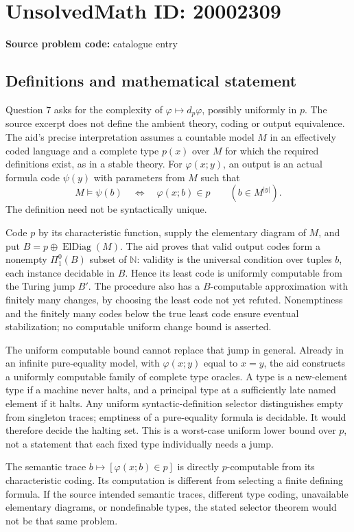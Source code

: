 \documentclass[11pt]{article}
\newcommand{\N}{\mathbb{N}}
\begin{document}
\section*{UnsolvedMath ID: 20002309}
\textbf{Source problem code:} catalogue entry
\subsection{Definitions and mathematical statement}
Question \(7\) asks for the complexity of \(\varphi\mapsto d_p\varphi\), possibly uniformly in \(p\). The source excerpt does not define the ambient theory, coding or output equivalence. The aid's precise interpretation assumes a countable model \(M\) in an effectively coded language and a complete type \(p(x)\) over \(M\) for which the required definitions exist, as in a stable theory. For \(\varphi(x;y)\), an output is an actual formula code \(\psi(y)\) with parameters from \(M\) such that
\[
 M\models\psi(b)\quad\Longleftrightarrow\quad
 \varphi(x;b)\in p
 \qquad(b\in M^{|y|}).
\]
The definition need not be syntactically unique.

Code \(p\) by its characteristic function, supply the elementary diagram of \(M\), and put \(B=p\oplus\operatorname{ElDiag}(M)\). The aid proves that valid output codes form a nonempty \(\Pi^0_1(B)\) subset of \(\N\): validity is the universal condition over tuples \(b\), each instance decidable in \(B\). Hence its least code is uniformly computable from the Turing jump \(B'\). The procedure also has a \(B\)-computable approximation with finitely many changes, by choosing the least code not yet refuted. Nonemptiness and the finitely many codes below the true least code ensure eventual stabilization; no computable uniform change bound is asserted.

The uniform computable bound cannot replace that jump in general. Already in an infinite pure-equality model, with \(\varphi(x;y)\) equal to \(x=y\), the aid constructs a uniformly computable family of complete type oracles. A type is a new-element type if a machine never halts, and a principal type at a sufficiently late named element if it halts. Any uniform syntactic-definition selector distinguishes empty from singleton traces; emptiness of a pure-equality formula is decidable. It would therefore decide the halting set. This is a worst-case uniform lower bound over \(p\), not a statement that each fixed type individually needs a jump.

The semantic trace \(b\mapsto[\varphi(x;b)\in p]\) is directly \(p\)-computable from its characteristic coding. Its computation is different from selecting a finite defining formula. If the source intended semantic traces, different type coding, unavailable elementary diagrams, or nondefinable types, the stated selector theorem would not be that same problem.
\end{document}
